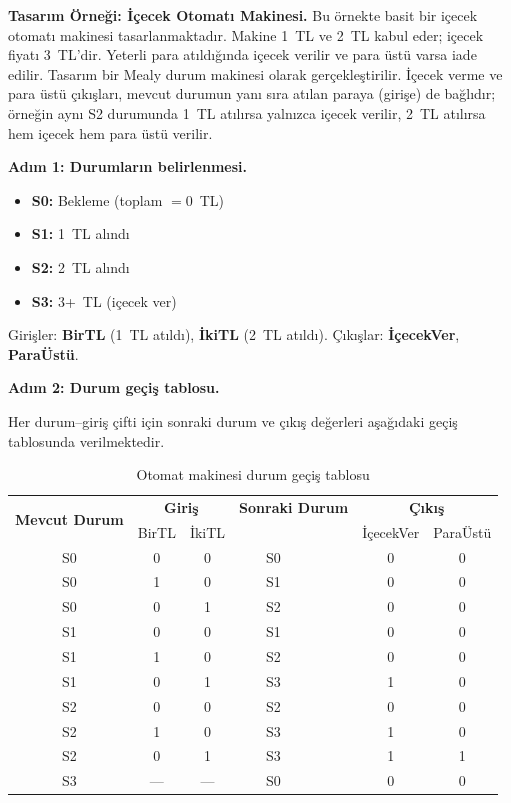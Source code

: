 \begin{ornek}[B.16]
\textbf{Tasarım Örneği: İçecek Otomatı Makinesi.} Bu örnekte basit bir içecek otomatı makinesi tasarlanmaktadır. Makine 1~TL ve 2~TL kabul eder; içecek fiyatı 3~TL'dir. Yeterli para atıldığında içecek verilir ve para üstü varsa iade edilir. Tasarım bir Mealy durum makinesi olarak gerçekleştirilir. İçecek verme ve para üstü çıkışları, mevcut durumun yanı sıra atılan paraya (girişe) de bağlıdır; örneğin aynı S2 durumunda 1~TL atılırsa yalnızca içecek verilir, 2~TL atılırsa hem içecek hem para üstü verilir.

\textbf{Adım 1: Durumların belirlenmesi.}

\begin{itemize}[nosep, leftmargin=2em]
    \item \textbf{S0:} Bekleme (toplam $= 0$~TL)
    \item \textbf{S1:} 1~TL alındı
    \item \textbf{S2:} 2~TL alındı
    \item \textbf{S3:} 3+~TL (içecek ver)
\end{itemize}

Girişler: \textbf{BirTL} (1~TL atıldı), \textbf{İkiTL} (2~TL atıldı).
Çıkışlar: \textbf{İçecekVer}, \textbf{ParaÜstü}.

\textbf{Adım 2: Durum geçiş tablosu.}

Her durum--giriş çifti için sonraki durum ve çıkış değerleri aşağıdaki geçiş tablosunda verilmektedir.

\begin{table}[H]
\centering
\caption*{Otomat makinesi durum geçiş tablosu}
\small
\begin{tabular}{c|cc|cc|cc}
\toprule
\multirow{2}{*}{\textbf{Mevcut Durum}} &
\multicolumn{2}{c|}{\textbf{Giriş}} &
\multicolumn{2}{c|}{\textbf{Sonraki Durum}} &
\multicolumn{2}{c}{\textbf{Çıkış}} \\
 & BirTL & İkiTL & & & İçecekVer & ParaÜstü \\
\midrule
S0 & 0 & 0 & S0 & & 0 & 0 \\
S0 & 1 & 0 & S1 & & 0 & 0 \\
S0 & 0 & 1 & S2 & & 0 & 0 \\
S1 & 0 & 0 & S1 & & 0 & 0 \\
S1 & 1 & 0 & S2 & & 0 & 0 \\
S1 & 0 & 1 & S3 & & 1 & 0 \\
S2 & 0 & 0 & S2 & & 0 & 0 \\
S2 & 1 & 0 & S3 & & 1 & 0 \\
S2 & 0 & 1 & S3 & & 1 & 1 \\
S3 & --- & --- & S0 & & 0 & 0 \\
\bottomrule
\end{tabular}
\end{table}


\end{ornek}
